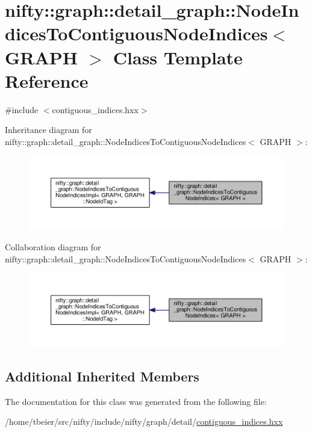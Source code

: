 \hypertarget{classnifty_1_1graph_1_1detail__graph_1_1NodeIndicesToContiguousNodeIndices}{}\section{nifty\+:\+:graph\+:\+:detail\+\_\+graph\+:\+:Node\+Indices\+To\+Contiguous\+Node\+Indices$<$ G\+R\+A\+P\+H $>$ Class Template Reference}
\label{classnifty_1_1graph_1_1detail__graph_1_1NodeIndicesToContiguousNodeIndices}


{\ttfamily \#include $<$contiguous\+\_\+indices.\+hxx$>$}



Inheritance diagram for nifty\+:\+:graph\+:\+:detail\+\_\+graph\+:\+:Node\+Indices\+To\+Contiguous\+Node\+Indices$<$ G\+R\+A\+P\+H $>$\+:\nopagebreak
\begin{figure}[H]
\begin{center}
\leavevmode
\includegraphics[width=350pt]{classnifty_1_1graph_1_1detail__graph_1_1NodeIndicesToContiguousNodeIndices__inherit__graph}
\end{center}
\end{figure}


Collaboration diagram for nifty\+:\+:graph\+:\+:detail\+\_\+graph\+:\+:Node\+Indices\+To\+Contiguous\+Node\+Indices$<$ G\+R\+A\+P\+H $>$\+:\nopagebreak
\begin{figure}[H]
\begin{center}
\leavevmode
\includegraphics[width=350pt]{classnifty_1_1graph_1_1detail__graph_1_1NodeIndicesToContiguousNodeIndices__coll__graph}
\end{center}
\end{figure}
\subsection*{Additional Inherited Members}


The documentation for this class was generated from the following file\+:\begin{DoxyCompactItemize}
\item 
/home/tbeier/src/nifty/include/nifty/graph/detail/\hyperlink{contiguous__indices_8hxx}{contiguous\+\_\+indices.\+hxx}\end{DoxyCompactItemize}

